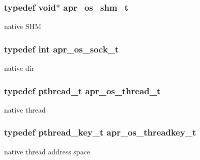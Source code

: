 \subsubsection[{\texorpdfstring{apr\+\_\+os\+\_\+shm\+\_\+t}{apr_os_shm_t}}]{\setlength{\rightskip}{0pt plus 5cm}typedef void$\ast$ {\bf apr\+\_\+os\+\_\+shm\+\_\+t}}\hypertarget{group__apr__portabile_ga7af1085d6390fbd08d66482b8c17de51}{}\label{group__apr__portabile_ga7af1085d6390fbd08d66482b8c17de51}
native S\+HM 
\subsubsection[{\texorpdfstring{apr\+\_\+os\+\_\+sock\+\_\+t}{apr_os_sock_t}}]{\setlength{\rightskip}{0pt plus 5cm}typedef int {\bf apr\+\_\+os\+\_\+sock\+\_\+t}}\hypertarget{group__apr__portabile_ga2965cd2e48cb6513bc0ba05aa6083ed7}{}\label{group__apr__portabile_ga2965cd2e48cb6513bc0ba05aa6083ed7}
native dir 
\subsubsection[{\texorpdfstring{apr\+\_\+os\+\_\+thread\+\_\+t}{apr_os_thread_t}}]{\setlength{\rightskip}{0pt plus 5cm}typedef pthread\+\_\+t {\bf apr\+\_\+os\+\_\+thread\+\_\+t}}\hypertarget{group__apr__portabile_ga4ccd9519af148ccf9cff850dd58f00b6}{}\label{group__apr__portabile_ga4ccd9519af148ccf9cff850dd58f00b6}
native thread 
\subsubsection[{\texorpdfstring{apr\+\_\+os\+\_\+threadkey\+\_\+t}{apr_os_threadkey_t}}]{\setlength{\rightskip}{0pt plus 5cm}typedef pthread\+\_\+key\+\_\+t {\bf apr\+\_\+os\+\_\+threadkey\+\_\+t}}\hypertarget{group__apr__portabile_ga0a228496d8a1a9b3be744ddb101a3e76}{}\label{group__apr__portabile_ga0a228496d8a1a9b3be744ddb101a3e76}
native thread address space 

